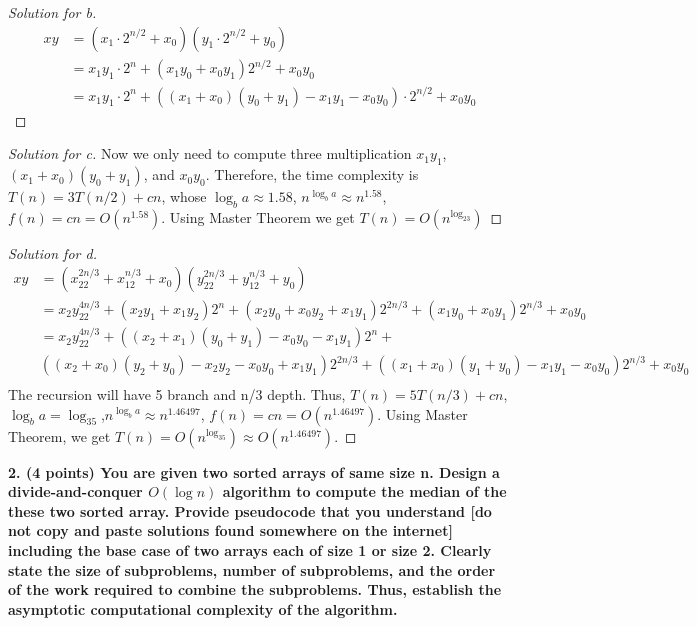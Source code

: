 \documentclass[12pt]{article}
\begin{document}
\begin{proof}[Solution for b]
	\begin{align*}
		xy&=(x_1\cdot2^{n/2}+x_0)(y_1\cdot2^{n/2}+y_0)\\
		&=x_1y_1\cdot2^{n}+(x_1y_0+x_0y_1)2^{n/2}+x_0y_0\\
		&=x_1y_1\cdot2^{n}+((x_1+x_0)(y_0+y_1)-x_1y_1-x_0y_0)\cdot2^{n/2}+x_0y_0
	\end{align*}
	
\end{proof}

\begin{proof}[Solution for c]
	Now we only need to compute three multiplication $x_1y_1$, $(x_1+x_0)(y_0+y_1)$, and $x_0y_0$. Therefore, the time complexity is $T(n)=3T(n/2)+cn$, whose $\log_ba\approx1.58$, $n^{\log_ba}\approx n^{1.58}$, $f(n)=cn=O(n^{1.58})$. Using Master Theorem we get $T(n)=O(n^{\log_23})$
\end{proof}

\begin{proof}[Solution for d]
	\begin{align*}
		xy&=(x_22^{2n/3}+x_12^{n/3}+x_0)(y_22^{2n/3}+y_12^{n/3}+y_0)\\
		&=x_2y_22^{4n/3}+(x_2y_1+x_1y_2)2^{n}+(x_2y_0+x_0y_2+x_1y_1)2^{2n/3}+(x_1y_0+x_0y_1)2^{n/3}+x_0y_0\\
		&=x_2y_22^{4n/3}+((x_2+x_1)(y_0+y_1)-x_0y_0-x_1y_1)2^n+\\
		&((x_2+x_0)(y_2+y_0)-x_2y_2-x_0y_0+x_1y_1)2^{2n/3}+((x_1+x_0)(y_1+y_0)-x_1y_1-x_0y_0)2^{n/3}+x_0y_0\\
	\end{align*}
	The recursion will have 5 branch and n/3 depth. Thus, $T(n)=5T(n/3)+cn$, $\log_ba=\log_35$,$n^{\log_ba}\approx n^{1.46497}$, $f(n)=cn=O(n^{1.46497})$. Using Master Theorem, we get $T(n)=O(n^{\log_35})\approx O(n^{1.46497})$.
\end{proof}
\textbf{2. (4 points) You are given two sorted arrays of same size n. Design a divide-and-conquer $O(\log n)$ algorithm to compute the median of the these two sorted array. Provide pseudocode that you understand [do not copy and paste solutions found somewhere on the internet] including the base case of two arrays each of size 1 or size 2. Clearly state the size of subproblems, number of subproblems, and the order of the work required to combine the subproblems. Thus, establish the asymptotic computational complexity of the algorithm.}
\end{document}
